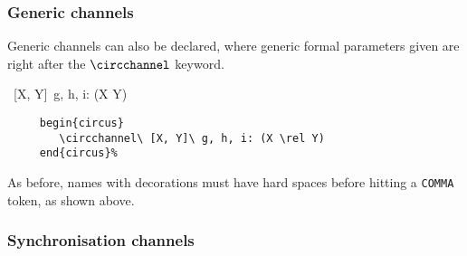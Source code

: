 \documentclass{article}
\begin{document}
\subsubsection{Generic channels}

Generic channels can also be declared, where generic formal parameters given
are right after the $\circchannel$ keyword.
%
\begin{circus}
   \circchannel\ [X, Y]\ g, h, i: (X \rel Y)
\end{circus}%
%
\begin{verbatim}
     begin{circus}
        \circchannel\ [X, Y]\ g, h, i: (X \rel Y)
     end{circus}%
\end{verbatim}
%
As before, names with decorations must have hard spaces before hitting a
\texttt{COMMA} token, as shown above.

%
%
%
%
%
%
%
%
%

\subsubsection{Synchronisation channels}
\end{document}
